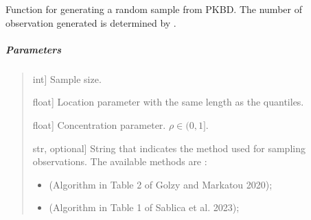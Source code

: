 \documentclass[letterpaper,10pt,english,openany,oneside]{sphinxmanual}
\begin{document}
\begin{fulllineitems}
\label{\detokenize{api_reference/generated/QuadratiK.spherical_clustering.PKBD:QuadratiK.spherical_clustering.PKBD.rpkb}}
\pysigstartsignatures
{}
\pysigstopsignatures
\sphinxAtStartPar
Function for generating a random sample from PKBD. 
The number of observation generated is determined by .


\subparagraph{Parameters}
\label{\detokenize{api_reference/generated/QuadratiK.spherical_clustering.PKBD:id1}}\begin{quote}
\begin{description}
\sphinxlineitem{n}{[}int{]}
\sphinxAtStartPar
Sample size.

\sphinxlineitem{mu}{[}float{]}
\sphinxAtStartPar
Location parameter with the same length as the quantiles.

\sphinxlineitem{rho}{[}float{]}
\sphinxAtStartPar
Concentration parameter. \(\rho \in (0,1]\).

\sphinxlineitem{method}{[}str, optional{]}
\sphinxAtStartPar
String that indicates the method used for sampling observations. 
The available methods are :
\begin{itemize}
\item {} \begin{description}
\sphinxAtStartPar
(Algorithm in Table 2 of Golzy and Markatou 2020);

\end{description}

\item {} \begin{description}
\sphinxAtStartPar
(Algorithm in Table 1 of Sablica et al. 2023);

\end{description}

\end{itemize}


\end{description}
\end{quote}
\end{fulllineitems}
\end{document}
